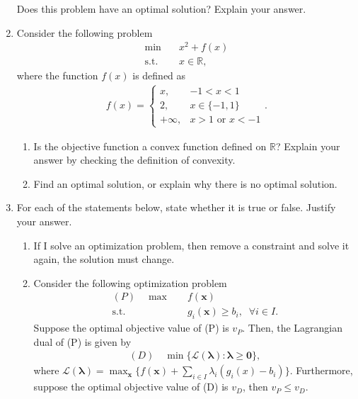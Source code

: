 \documentclass{article}
\def\x{\bm{x}}
\begin{document}
\begin{enumerate}
Does this problem have an optimal solution? Explain your answer.

\item Consider the following problem
\begin{align*}
    \min \quad & x^2 + f(x) \\
    \text{s.t.} \quad & x \in \mathbb{R},
\end{align*}
where the function $f(x)$ is defined as
\begin{align*}
    f(x) = \begin{cases}
                x, & -1 < x < 1\\
                2, & x \in \{-1, 1\}\\
                +\infty, & x>1 \text{ or } x<-1
            \end{cases}.
\end{align*}    
\begin{enumerate}
    \item Is the objective function a convex function defined on $\mathbb{R}$? Explain your answer by checking the definition of convexity.
    
    \item Find an optimal solution, or explain why there is no optimal solution.  
\end{enumerate}

\item For each of the statements below, state whether it is true or false. Justify your answer.
\begin{enumerate}

\item If I solve an optimization problem, then remove a constraint and solve it again, the solution must change.

\item Consider the following optimization problem
\begin{align*}
    (P)\quad \max \quad & f(\x) \\
    \text{s.t.}\quad & g_i(\x)\ge b_i, \;\; \forall i \in I.
\end{align*}
Suppose the optimal objective value of (P) is $v_P$. Then, the Lagrangian dual of (P) is given by
\begin{align}
    (D) \quad \min\{\mathcal{L}(\bm{\lambda}) : \bm{\lambda} \ge \bm{0}\},
\end{align}
where $\mathcal{L}(\bm{\lambda}) = \max_{\x}\{f(\x) + \sum_{i\in I}\lambda_i(g_i(x)-b_i)\}$. Furthermore, suppose the optimal objective value of (D) is $v_D$, then $v_P \le v_D$. 


\end{enumerate}
\end{enumerate}
\end{document}
